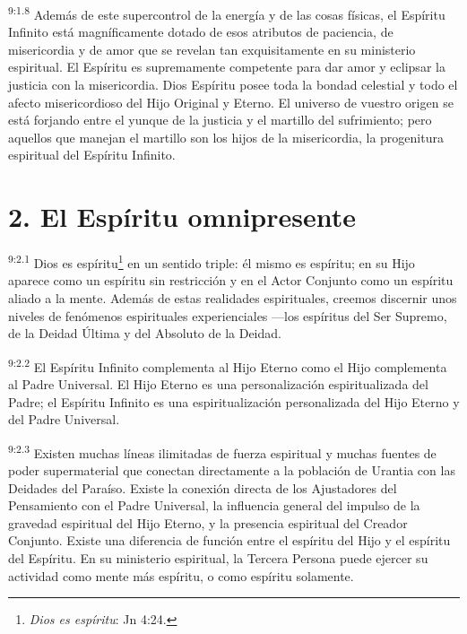 \par
\textsuperscript{9:1.8} Además de este supercontrol de la energía y de las cosas físicas, el Espíritu Infinito está magníficamente dotado de esos atributos de paciencia, de misericordia y de amor que se revelan tan exquisitamente en su ministerio espiritual. El Espíritu es supremamente competente para dar amor y eclipsar la justicia con la misericordia. Dios Espíritu posee toda la bondad celestial y todo el afecto misericordioso del Hijo Original y Eterno. El universo de vuestro origen se está forjando entre el yunque de la justicia y el martillo del sufrimiento; pero aquellos que manejan el martillo son los hijos de la misericordia, la progenitura espiritual del Espíritu Infinito.

\section*{2. El Espíritu omnipresente}
\par
\textsuperscript{9:2.1} Dios es espíritu\footnote{\textit{Dios es espíritu}: Jn 4:24.} en un sentido triple: él mismo es espíritu; en su Hijo aparece como un espíritu sin restricción y en el Actor Conjunto como un espíritu aliado a la mente. Además de estas realidades espirituales, creemos discernir unos niveles de fenómenos espirituales experienciales ---los espíritus del Ser Supremo, de la Deidad Última y del Absoluto de la Deidad.

\par
\textsuperscript{9:2.2} El Espíritu Infinito complementa al Hijo Eterno como el Hijo complementa al Padre Universal. El Hijo Eterno es una personalización espiritualizada del Padre; el Espíritu Infinito es una espiritualización personalizada del Hijo Eterno y del Padre Universal.

\par
\textsuperscript{9:2.3} Existen muchas líneas ilimitadas de fuerza espiritual y muchas fuentes de poder supermaterial que conectan directamente a la población de Urantia con las Deidades del Paraíso. Existe la conexión directa de los Ajustadores del Pensamiento con el Padre Universal, la influencia general del impulso de la gravedad espiritual del Hijo Eterno, y la presencia espiritual del Creador Conjunto. Existe una diferencia de función entre el espíritu del Hijo y el espíritu del Espíritu. En su ministerio espiritual, la Tercera Persona puede ejercer su actividad como mente más espíritu, o como espíritu solamente.

